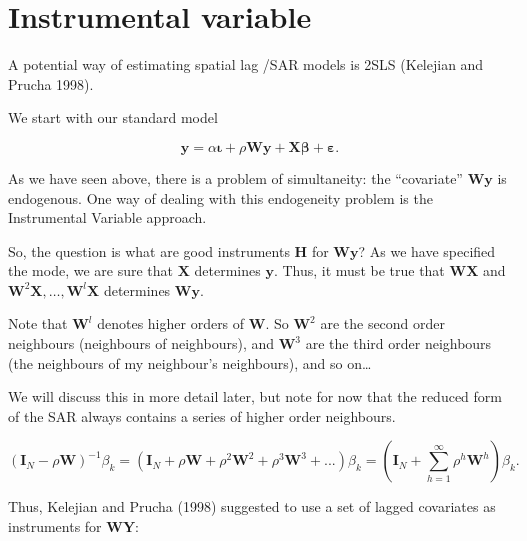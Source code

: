 \documentclass[
  letterpaper,
]{scrbook}
\begin{document}
\hypertarget{instrumental-variable}{%
\section{Instrumental variable}\label{instrumental-variable}}

A potential way of estimating spatial lag /SAR models is 2SLS (Kelejian
and Prucha 1998).

We start with our standard model

\[
        {\boldsymbol{\mathbf{y}}}=\alpha{\boldsymbol{\mathbf{\iota}}}+\rho{\boldsymbol{\mathbf{W}}}{\boldsymbol{\mathbf{y}}}+{\boldsymbol{\mathbf{X}}}{\boldsymbol{\mathbf{\beta}}}+ {\boldsymbol{\mathbf{\varepsilon}}}. 
\]

As we have seen above, there is a problem of simultaneity: the
``covariate'' \({\boldsymbol{\mathbf{W}}}{\boldsymbol{\mathbf{y}}}\) is
endogenous. One way of dealing with this endogeneity problem is the
Instrumental Variable approach.

So, the question is what are good instruments
\(\boldsymbol{\mathbf{H}}\) for
\({\boldsymbol{\mathbf{W}}}{\boldsymbol{\mathbf{y}}}\)? As we have
specified the mode, we are sure that \({\boldsymbol{\mathbf{X}}}\)
determines \({\boldsymbol{\mathbf{y}}}\). Thus, it must be true that
\({\boldsymbol{\mathbf{W}}}{\boldsymbol{\mathbf{X}}}\) and
\({\boldsymbol{\mathbf{W}}}^2{\boldsymbol{\mathbf{X}}},\ldots, {\boldsymbol{\mathbf{W}}}^l{\boldsymbol{\mathbf{X}}}\)
determines \({\boldsymbol{\mathbf{W}}}{\boldsymbol{\mathbf{y}}}\).

Note that \({\boldsymbol{\mathbf{W}}}^l\) denotes higher orders of
\({\boldsymbol{\mathbf{W}}}\). So \({\boldsymbol{\mathbf{W}}}^2\) are
the second order neighbours (neighbours of neighbours), and
\({\boldsymbol{\mathbf{W}}}^3\) are the third order neighbours (the
neighbours of my neighbour's neighbours), and so on\ldots{}

We will discuss this in more detail later, but note for now that the
reduced form of the SAR always contains a series of higher order
neighbours.

\[
({\boldsymbol{\mathbf{I}}_N}-\rho {\boldsymbol{\mathbf{W}}})^{-1}\beta_k 
=({\boldsymbol{\mathbf{I}}_N} + \rho{\boldsymbol{\mathbf{W}}} + \rho^2{\boldsymbol{\mathbf{W}}}^2 + \rho^3{\boldsymbol{\mathbf{W}}}^3 + ...)\beta_k 
= ({\boldsymbol{\mathbf{I}}_N} + \sum_{h=1}^\infty \rho^h{\boldsymbol{\mathbf{W}}}^h)\beta_k .
\]

Thus, Kelejian and Prucha (1998) suggested to use a set of lagged
covariates as instruments for
\(\boldsymbol{\mathbf{W}} \boldsymbol{\mathbf{Y}}\):
\end{document}

